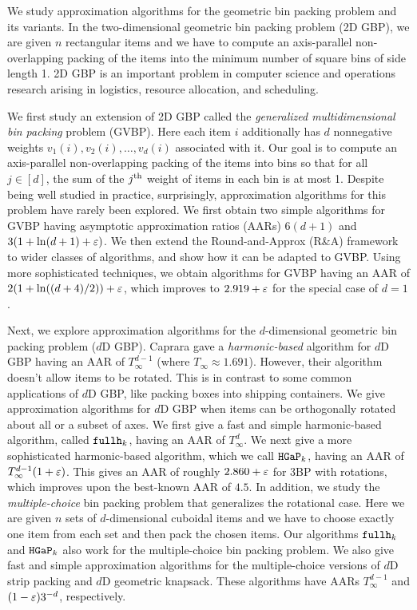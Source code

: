 We study approximation algorithms for
the geometric bin packing problem and its variants.
In the two-dimensional geometric bin packing problem (2D GBP),
we are given $n$ rectangular items and we have to compute
an axis-parallel non-overlapping packing
of the items into the minimum number of square bins of side length 1.
2D GBP is an important problem in computer science and operations research
arising in logistics, resource allocation, and scheduling.

We first study an extension of 2D GBP called the
\emph{generalized multidimensional bin packing} problem (GVBP).
Here each item $i$ additionally has $d$ nonnegative weights
$v_1(i), v_2(i), \ldots, v_d(i)$ associated with it.
Our goal is to compute an axis-parallel non-overlapping packing of the items into bins so that
for all $j \in [d]$, the sum of the $j^{\textrm{th}}$ weight of items in each bin is at most 1.
Despite being well studied in practice, surprisingly,
approximation algorithms for this problem have rarely been explored.
We first obtain two simple algorithms for GVBP having asymptotic approximation ratios (AARs)
$6(d+1)$ and $3(1 + \ln(d+1) + \varepsilon)$.
We then extend the Round-and-Approx (R\&A) framework
to wider classes of algorithms, and show how it can be adapted to GVBP.
Using more sophisticated techniques, we obtain algorithms for GVBP having
an AAR of $2(1+\ln((d+4)/2))+\varepsilon$,
which improves to $2.919+\varepsilon$ for the special case of $d=1$.

Next, we explore approximation algorithms for the $d$-dimensional
geometric bin packing problem ($d$D GBP).
Caprara 
gave a \emph{harmonic-based} algorithm for $d$D GBP having an AAR of
\texorpdfstring{$T_{\infty}^{d-1}$ (where $T_{\infty} \approx 1.691$)}{1.69104^(d-1)}.
However, their algorithm doesn't allow items to be rotated.
This is in contrast to some common applications of $d$D GBP,
like packing boxes into shipping containers.
We give approximation algorithms for $d$D GBP when items can be
orthogonally rotated about all or a subset of axes.
We first give a fast and simple harmonic-based algorithm,
called \texorpdfstring{$\operatorname{\mathtt{fullh}}_{k}$}{fullh\_k}, having an AAR of
\texorpdfstring{$T_{\infty}^{d}$}{1.69104^d}.
We next give a more sophisticated harmonic-based algorithm,
which we call \texorpdfstring{$\operatorname{\mathtt{HGaP}}_{k}$}{hgap\_k},
having an AAR of \texorpdfstring{$T_{\infty}^{d-1}(1+\varepsilon)$}{(1+eps)1.69104^(d-1)}.
This gives an AAR of roughly $2.860 + \varepsilon$ for 3BP with rotations,
which improves upon the best-known AAR of $4.5$.
In addition, we study the \emph{multiple-choice} bin packing problem
that generalizes the rotational case.
Here we are given $n$ sets of $d$-dimensional cuboidal items and we have to
choose exactly one item from each set and then pack the chosen items.
Our algorithms \texorpdfstring{$\operatorname{\mathtt{fullh}}_{k}$}{fullh\_k} and \texorpdfstring{$\operatorname{\mathtt{HGaP}}_{k}$}{hgap\_k}
also work for the multiple-choice bin packing problem.
We also give fast and simple approximation algorithms for the multiple-choice
versions of $d$D strip packing and $d$D geometric knapsack.
These algorithms have AARs
\texorpdfstring{$T_{\infty}^{d-1}$}{1.69104^(d-1)} and $(1-\varepsilon)3^{-d}$, respectively.

